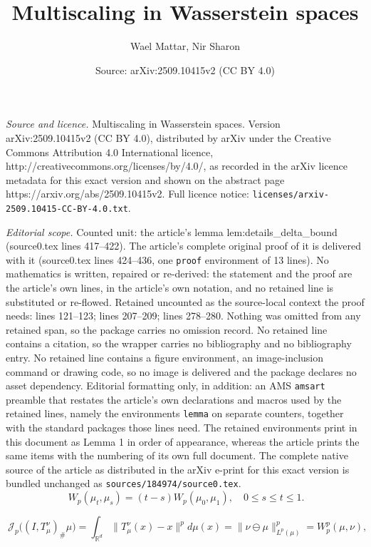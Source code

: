 \documentclass[10pt,a4paper]{amsart}
\title{Multiscaling in Wasserstein spaces}
\author{Wael Mattar, Nir Sharon}
\date{Source: arXiv:2509.10415v2 (CC BY 4.0)}
\begin{document}
\maketitle

\noindent\emph{Source and licence.} Multiscaling in Wasserstein spaces. Version arXiv:2509.10415v2 (CC BY 4.0), distributed by arXiv under the Creative Commons Attribution 4.0 International licence, http://creativecommons.org/licenses/by/4.0/, as recorded in the arXiv licence metadata for this exact version and shown on the abstract page https://arxiv.org/abs/2509.10415v2. Full licence notice: \texttt{licenses/arxiv-2509.10415-CC-BY-4.0.txt}.\par\smallskip

\noindent\textit{Editorial scope.} Counted unit: the article's lemma lem:details\_delta\_bound (source0.tex lines 417--422). The article's complete original proof of it is delivered with it (source0.tex lines 424--436, one \texttt{proof} environment of 13 lines). No mathematics is written, repaired or re-derived: the statement and the proof are the article's own lines, in the article's own notation, and no retained line is substituted or re-flowed.  Retained uncounted as the source-local context the proof needs: lines 121--123; lines 207--209; lines 278--280.  Nothing was omitted from any retained span, so the package carries no omission record.  No retained line contains a citation, so the wrapper carries no bibliography and no bibliography entry.  No retained line contains a figure environment, an image-inclusion command or drawing code, so no image is delivered and the package declares no asset dependency.  Editorial formatting only, in addition: an AMS \texttt{amsart} preamble that restates the article's own declarations and macros used by the retained lines, namely the environments \texttt{lemma} on separate counters, together with the standard packages those lines need.  The retained environments print in this document as Lemma 1 in order of appearance, whereas the article prints the same items with the numbering of its own full document.  The complete native source of the article as distributed in the arXiv e-print for this exact version is bundled unchanged as \texttt{sources/184974/source0.tex}.
\begin{equation}~\label{eqn:constant_speed}
    W_p(\mu_t, \mu_s) = (t-s)W_p(\mu_0, \mu_1), \quad 0\leq s\leq t\leq 1.
\end{equation}

\begin{equation}~\label{eqn:useful_relation}
    \mathcal{J}_p\big((I,T_{\mu}^\nu)_{\#}\mu\big) = \int_{\mathbb{R}^d}\|T_\mu^\nu(x) - x\|^p d\mu(x) = \|\nu \ominus \mu\|^p_{L^p(\mu)} = W_p^p(\mu, \nu),
\end{equation}
\end{document}
